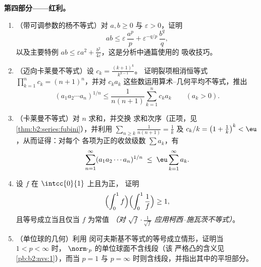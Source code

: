 \begin{problem}
\medskip
\noindent\textbf{第四部分——红利。}
\begin{enumerate}[resume]
  \item （带可调参数的杨不等式）对 $a, b \geq 0$ 与 $\varepsilon >
        0$，证明
        \[
        ab \leq \varepsilon\,\frac{a^p}{p} +
        \varepsilon^{-q/p}\,\frac{b^q}{q},
        \]
        以及主要特例 $ab \leq \varepsilon a^2 +
        \frac{b^2}{4\varepsilon}$，这是分析中通篇使用的
        吸收技巧。
  \item （迈向卡莱曼不等式）设 $c_k = \frac{(k+1)^k}{k^{k-1}}$。
        证明裂项相消恒等式 $\prod_{k=1}^{n}c_k =
        (n+1)^n$，并对
        $c_ka_k$ 这些数运用算术--几何平均不等式，推出
        \[
        (a_1a_2\cdots a_n)^{1/n} \leq
        \frac{1}{n(n+1)}\sum_{k=1}^{n} c_k a_k
        \qquad (a_k > 0).
        \]
  \item （卡莱曼不等式）对 $n$ 求和，并交换
        求和次序（正项，见
        \cref{thm:b2:series:fubini}），并利用 $\sum_{n \geq
        k}\frac{1}{n(n+1)} = \frac1k$ 及 $c_k/k = \bigl(1 +
        \frac1k\bigr)^k < \eu$，从而证得：对每个
        各项为正的收敛级数 $\sum a_k$，有
        \[
        \sum_{n=1}^{\infty}(a_1a_2\cdots a_n)^{1/n}
        \;\leq\; \eu\sum_{k=1}^{\infty}a_k .
        \]
  \item 设 $f$ 在 $\intcc{0}{1}$ 上且为正，
        证明
        \[
        \Bigl(\int_0^1 f\Bigr)\Bigl(\int_0^1\frac1f\Bigr)
        \geq 1,
        \]
        且等号成立当且仅当 $f$ 为常值
        \emph{（对 $\sqrt f\cdot\frac1{\sqrt
        f}$ 应用柯西--施瓦茨不等式）}。
  \item （单位球的几何）利用
        闵可夫斯基不等式的等号成立情形，证明当 $1 < p < \infty$ 时，
        $\norm\cdot_p$ 的单位球面不含线段（该
        严格凸的含义见
        \cref{pb:b2:nvs:1}），而当 $p = 1$ 与 $p =
        \infty$ 时则含线段，并指出其中的平坦部分。
\end{enumerate}


\end{problem}
